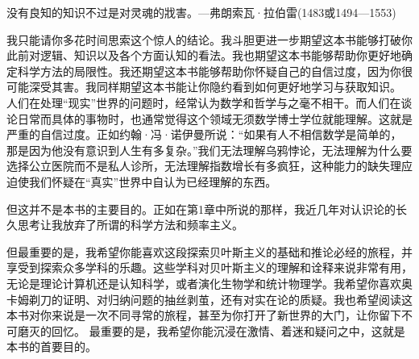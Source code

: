 没有良知的知识不过是对灵魂的戕害。---弗朗索瓦·拉伯雷(1483或1494—1553)

我只能请你多花时间思索这个惊人的结论。我斗胆更进一步期望这本书能够打破你此前对逻辑、知识以及各个方面认知的看法。我也期望这本书能够帮助你更好地确定科学方法的局限性。我还期望这本书能够帮助你怀疑自己的自信过度，因为你很可能深受其害。我同样期望这本书能让你隐约看到如何更好地学习与获取知识。
人们在处理“现实”世界的问题时，经常认为数学和哲学与之毫不相干。而人们在谈论日常而具体的事物时，也通常觉得这个领域无须数学博士学位就能理解。这就是严重的自信过度。正如约翰·冯·诺伊曼所说：“如果有人不相信数学是简单的，那是因为他没有意识到人生有多复杂。”我们无法理解乌鸦悖论，无法理解为什么要选择公立医院而不是私人诊所，无法理解指数增长有多疯狂，这种能力的缺失理应迫使我们怀疑在“真实”世界中自认为已经理解的东西。

但这并不是本书的主要目的。正如在第1章中所说的那样，我近几年对认识论的长久思考让我放弃了所谓的科学方法和频率主义。

但最重要的是，我希望你能喜欢这段探索贝叶斯主义的基础和推论必经的旅程，并享受到探索众多学科的乐趣。这些学科对贝叶斯主义的理解和诠释来说非常有用，无论是理论计算机还是认知科学，或者演化生物学和统计物理学。我希望你喜欢奥卡姆剃刀的证明、对归纳问题的抽丝剥茧，还有对实在论的质疑。我也希望阅读这本书对你来说是一次不同寻常的旅程，甚至为你打开了新世界的大门，让你留下不可磨灭的回忆。
最重要的是，我希望你能沉浸在激情、着迷和疑问之中，这就是本书的首要目的。